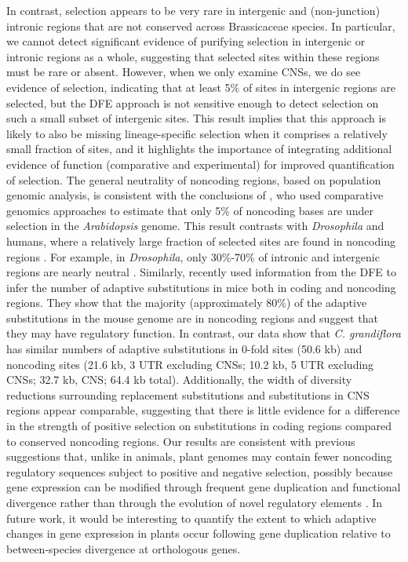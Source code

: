 In contrast, selection appears to be very rare in intergenic and (non-junction) intronic regions that are not conserved across Brassicaceae species. In particular, we cannot detect significant evidence of purifying selection in intergenic or intronic regions as a whole, suggesting that selected sites within these regions must be rare or absent. However, when we only examine CNSs, we do see evidence of selection, indicating that at least 5\% of sites in intergenic regions are selected, but the DFE approach is not sensitive enough to detect selection on such a small subset of intergenic sites. This result implies that this approach is likely to also be missing lineage-specific selection when it comprises a relatively small fraction of sites, and it highlights the importance of integrating additional evidence of function (comparative and experimental) for improved quantification of selection.
The general neutrality of noncoding regions, based on population genomic analysis, is consistent with the conclusions of \citet{Haudry2013-qe}, who used comparative genomics approaches to estimate that only 5\% of noncoding bases are under selection in the \textit{Arabidopsis} genome. This result contrasts with \textit{Drosophila} and humans, where a relatively large fraction of selected sites are found in noncoding regions \citep{hough2013}. For example, in \textit{Drosophila}, only 30\%-70\% of intronic and intergenic regions are nearly neutral \citep{andolfatto2005, Eyre-Walker2009-zt, sella2009}. Similarly, \citet{Halligan2013} recently used information from the DFE to infer the number of adaptive substitutions in mice both in coding and noncoding regions. They show that the majority (approximately 80\%) of the adaptive substitutions in the mouse genome are in noncoding regions and suggest that they may have regulatory function. In contrast, our data show that \textit{C. grandiflora} has similar numbers of adaptive substitutions in 0-fold sites (50.6 kb) and noncoding sites (21.6 kb, 3\textsc{} UTR excluding CNSs; 10.2 kb, 5\textsc{} UTR excluding CNSs; 32.7 kb, CNS; 64.4 kb total). Additionally, the width of diversity reductions surrounding replacement substitutions and substitutions in CNS regions appear comparable, suggesting that there is little evidence for a difference in the strength of positive selection on substitutions in coding regions compared to conserved noncoding regions. Our results are consistent with previous suggestions that, unlike in animals, plant genomes may contain fewer noncoding regulatory sequences subject to positive and negative selection, possibly because gene expression can be modified through frequent gene duplication and functional divergence rather than through the evolution of novel regulatory elements \citep{lockton2005}. In future work, it would be interesting to quantify the extent to which adaptive changes in gene expression in plants occur following gene duplication relative to between-species divergence at orthologous genes.

